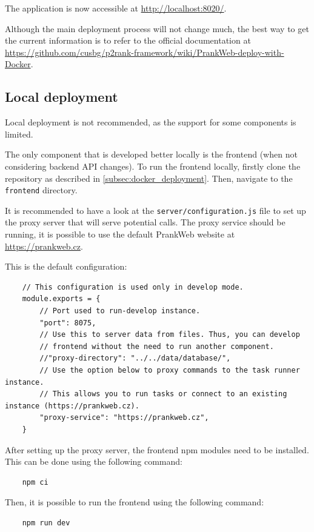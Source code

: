 The application is now accessible at \url{http://localhost:8020/}.

Although the main deployment process will not change much, the best way to get the current information is to refer to the official documentation at \url{https://github.com/cusbg/p2rank-framework/wiki/PrankWeb-deploy-with-Docker}.

\subsection{Local deployment}
\label{subsec:local_deployment}

Local deployment is not recommended, as the support for some components is limited.

The only component that is developed better locally is the frontend (when not considering backend API changes). To run the frontend locally, firstly clone the repository as described in \ref{subsec:docker_deployment}. Then, navigate to the \texttt{frontend} directory.

It is recommended to have a look at the \texttt{server/configuration.js} file to set up the proxy server that will serve potential calls. The proxy service should be running, it is possible to use the default PrankWeb website at \url{https://prankweb.cz}.

This is the default configuration:
\begin{lstlisting}
    // This configuration is used only in develop mode.
    module.exports = {
        // Port used to run-develop instance.
        "port": 8075,
        // Use this to server data from files. Thus, you can develop
        // frontend without the need to run another component.
        //"proxy-directory": "../../data/database/",
        // Use the option below to proxy commands to the task runner instance.
        // This allows you to run tasks or connect to an existing instance (https://prankweb.cz).
        "proxy-service": "https://prankweb.cz",
    }
\end{lstlisting}

After setting up the proxy server, the frontend npm modules need to be installed. This can be done using the following command:
\begin{lstlisting}
    npm ci
\end{lstlisting}

Then, it is possible to run the frontend using the following command:
\begin{lstlisting}
    npm run dev
\end{lstlisting}

